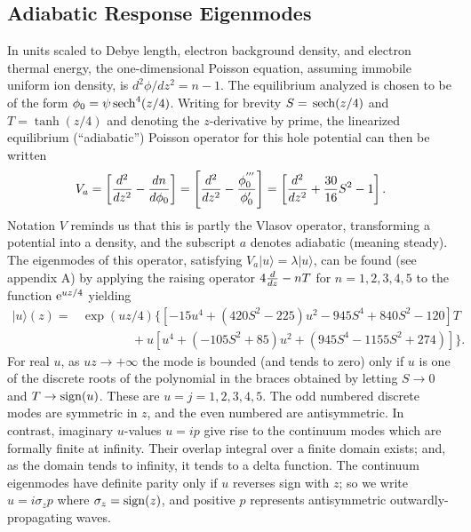 \documentclass[12pt]{article}
\def\ket#1{|#1\rangle}
\def\sech{{\,\rm sech}}
\def\etothe#1{{\rm e}^{#1}}
\begin{document}
\subsection{Adiabatic Response Eigenmodes}
In units scaled to Debye length, electron
background density, and electron thermal energy, the one-dimensional
Poisson equation, assuming immobile uniform ion density, is
$d^2\phi/dz^2=n-1$. The equilibrium analyzed is chosen to be of the
form $\phi_0=\psi\sech^4(z/4)$. Writing for brevity $S=\sech(z/4)$ and
$T=\tanh(z/4)$ and denoting the $z$-derivative by prime, the
linearized equilibrium (``adiabatic'') Poisson operator for this hole
potential can then be written
\begin{equation}
  \label{eq:1}
  V_a = \left[{d^2\over dz^2} - {dn\over d\phi_0}\right]
  = \left[{d^2\over dz^2} - {\phi_0^{'''}\over \phi_0'}\right]
  = \left[{d^2\over dz^2} +{30\over 16}S^2- 1\right].
\end{equation}
Notation $V$ reminds us that this is partly the Vlasov operator,
transforming a potential into a density, and the subscript $a$ denotes
adiabatic (meaning steady).  The eigenmodes of this
operator, satisfying $V_a\ket{u}=\lambda \ket{u}$, can be found (see
appendix A) by
applying the raising operator $4 {d\over dz}-n T$ for $n=1,2,3,4,5$ to
the function $ \etothe{uz/4}$ yielding
\begin{equation}
  \label{eq:2}
  \begin{split}
 \ket{u}(z)= &\exp(uz/4)\{[-15u^4 + (420S^2 - 225)u^2 - 945S^4 +
 840S^2 - 120]T \\
 &\qquad\qquad+ u[u^4 + (-105S^2 + 85)u^2 + (945S^4 - 1155S^2
 +274)]\}.
\end{split}
\end{equation}
For real $u$, as $u z\to+\infty$ the mode is bounded (and tends to
zero) only if $u$ is one of the discrete roots of the polynomial in
the braces obtained by letting $S\to 0$ and $T\to {\rm sign}(u)$. These
are $u=j=1,2,3,4,5$. The odd numbered discrete modes are symmetric in
$z$, and the even numbered are antisymmetric. In contrast, imaginary
$u$-values $u=ip$ give rise to the continuum modes which are formally
finite at infinity. Their overlap integral over a finite domain
exists; and, as the domain tends to infinity, it tends to a delta
function. The continuum eigenmodes have definite parity only if $u$
reverses sign with $z$; so we write $u=i \sigma_z p$ where
$\sigma_z={\rm sign}(z)$, and positive $p$ represents antisymmetric
outwardly-propagating waves.
\end{document}
